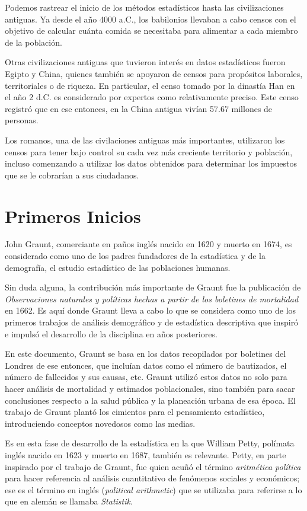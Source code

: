 \documentclass[12pt, a4paper]{article}
\begin{document}
Podemos rastrear el inicio de los métodos estadísticos hasta las civilizaciones antiguas. Ya desde el año 4000 a.C., los babilonios llevaban a cabo censos con el objetivo de calcular cuánta comida se necesitaba para alimentar a cada miembro de la población.

Otras civilizaciones antiguas que tuvieron interés en datos estadísticos fueron Egipto y China, quienes también se apoyaron de censos para propósitos laborales, territoriales o de riqueza. En particular, el censo tomado por la dinastía Han en el año 2 d.C. es considerado por expertos como relativamente preciso. Este censo registró que en ese entonces, en la China antigua vivían 57.67 millones de personas.

Los romanos, una de las civilaciones antiguas más importantes, utilizaron los censos para tener bajo control su cada vez más creciente territorio y población, incluso comenzando a utilizar los datos obtenidos para determinar los impuestos que se le cobrarían a sus ciudadanos.

\section{Primeros Inicios}

John Graunt, comerciante en paños inglés nacido en 1620 y muerto en 1674, es considerado como uno de los padres fundadores de la estadística y de la demografía, el estudio estadístico de las poblaciones humanas.

Sin duda alguna, la contribución más importante de Graunt fue la publicación de \textit{Observaciones naturales y políticas hechas a partir de los boletines de mortalidad} en 1662. Es aquí donde Graunt lleva a cabo lo que se considera como uno de los primeros trabajos de análisis demográfico y de estadística descriptiva que inspiró e impulsó el desarrollo de la disciplina en años posteriores.

En este documento, Graunt se basa en los datos recopilados por boletines del Londres de ese entonces, que incluían datos como el número de bautizados, el número de fallecidos y sus causas, etc. Graunt utilizó estos datos no solo para hacer análisis de mortalidad y estimados poblacionales, sino también para	sacar conclusiones respecto a la salud pública y la planeación urbana de esa época. El trabajo de Graunt plantó los cimientos para el pensamiento estadístico, introduciendo conceptos novedosos como las medias.

Es en esta fase de desarrollo de la estadística en la que William Petty, polímata inglés nacido en 1623 y muerto en 1687, también es relevante. Petty, en parte inspirado por el trabajo de Graunt, fue quien acuñó el término \textit{aritmética política} para hacer referencia al análisis cuantitativo de fenómenos sociales y económicos; ese es el término en inglés (\textit{political arithmetic}) que se utilizaba para referirse a lo que en alemán se llamaba \textit{Statistik}.
\end{document}
